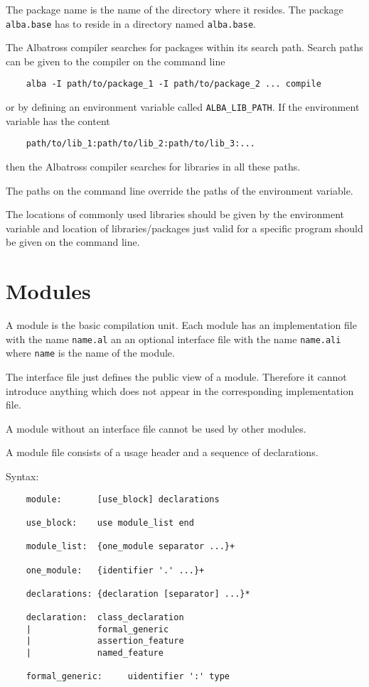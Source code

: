 The package name is the name of the directory where it resides. The package
\lstinline!alba.base! has to reside in a directory named \lstinline!alba.base!.

The Albatross compiler searches for packages within its search path. Search
paths can be given to the compiler on the command line
\begin{lstlisting}
    alba -I path/to/package_1 -I path/to/package_2 ... compile
\end{lstlisting}
or by defining an environment variable called \lstinline!ALBA_LIB_PATH!. If the
environment variable has the content
%
\begin{lstlisting}
    path/to/lib_1:path/to/lib_2:path/to/lib_3:...
\end{lstlisting}
%
then the Albatross compiler searches for libraries in all these paths.

The paths on the command line override the paths of the environment variable.

The locations of commonly used libraries should be given by the environment
variable and location of libraries/packages just valid for a specific program
should be given on the command line.



\section{Modules}

A module is the basic compilation unit. Each module has an implementation file
with the name \lstinline!name.al! an an optional interface file with the name
\lstinline!name.ali!  where \lstinline!name! is the name of the module.

The interface file just defines the public view of a module. Therefore it
cannot introduce anything which does not appear in the corresponding
implementation file.

A module without an interface file cannot be used by other modules.

A module file consists of a usage header and a sequence of declarations.

\noindent Syntax:
\begin{lstlisting}
    module:       [use_block] declarations

    use_block:    use module_list end

    module_list:  {one_module separator ...}+

    one_module:   {identifier '.' ...}+

    declarations: {declaration [separator] ...}*

    declaration:  class_declaration
    |             formal_generic
    |             assertion_feature
    |             named_feature

    formal_generic:     uidentifier ':' type
\end{lstlisting}

